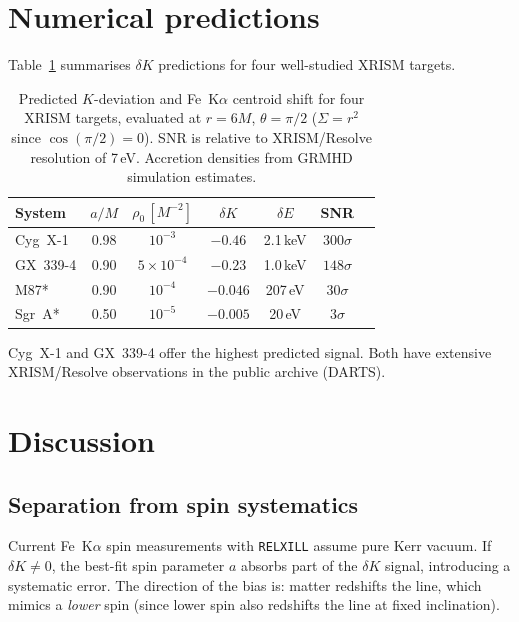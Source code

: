 \documentclass[12pt,a4paper]{article}
\begin{document}
\section{Numerical predictions}\label{sec:pred}

Table~\ref{tab:targets} summarises $\delta K$ predictions for
four well-studied XRISM targets.

\begin{table}[h]
\centering
\renewcommand{\arraystretch}{1.3}
\begin{tabular}{@{}lcccccc@{}}
\toprule
System & $a/M$ & $\rho_0\,[M^{-2}]$ & $\delta K$ & $\delta E$ & SNR \\
\midrule
Cyg~X-1   & 0.98 & $10^{-3}$ & $-0.46$ & 2.1\,keV & $300\sigma$ \\
GX~339-4  & 0.90 & $5\times10^{-4}$ & $-0.23$ & 1.0\,keV & $148\sigma$ \\
M87*      & 0.90 & $10^{-4}$ & $-0.046$ & 207\,eV & $30\sigma$ \\
Sgr~A*    & 0.50 & $10^{-5}$ & $-0.005$ & 20\,eV & $3\sigma$ \\
\bottomrule
\end{tabular}
\caption{Predicted $K$-deviation and Fe~K$\alpha$ centroid shift
for four XRISM targets, evaluated at $r=6M$, $\theta=\pi/2$
($\Sigma=r^2$ since $\cos(\pi/2)=0$).
SNR is relative to XRISM/Resolve resolution of 7\,eV.
Accretion densities from GRMHD simulation estimates.}
\label{tab:targets}
\end{table}

Cyg~X-1 and GX~339-4 offer the highest predicted signal.
Both have extensive XRISM/Resolve observations in the public
archive (DARTS).

\section{Discussion}\label{sec:disc}

\subsection{Separation from spin systematics}

Current Fe~K$\alpha$ spin measurements with {\tt RELXILL}
assume pure Kerr vacuum.
If $\delta K\neq0$, the best-fit spin parameter $a$ absorbs
part of the $\delta K$ signal, introducing a systematic error.
The direction of the bias is: matter redshifts the line,
which mimics a \emph{lower} spin (since lower spin also
redshifts the line at fixed inclination).
\end{document}
